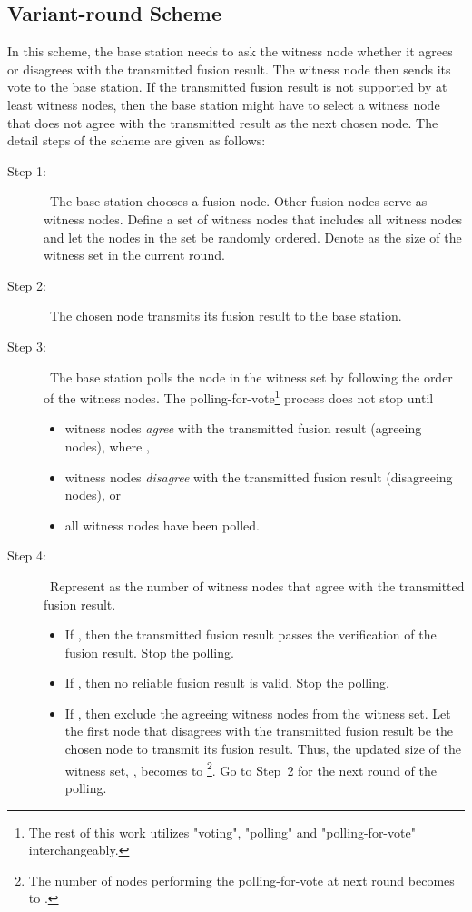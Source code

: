 \documentclass[12pt, onecolumn, draftcls]{IEEEtran}
\begin{document}
\subsection{Variant-round Scheme}
\label{subsec:variant} In this scheme, the base station needs to ask
the witness node whether it agrees or disagrees with the transmitted
fusion result. The witness node then sends its vote to the base
station. If the transmitted fusion result is not supported by at
least  witness nodes, then the base station might have to select
a witness node that does not agree with the transmitted result as
the next chosen node. The detail steps of the scheme are given as
follows:
\begin{description}
\item[Step 1: ]\ The base station chooses a fusion node.
Other fusion nodes serve as witness nodes. Define a set of witness
nodes that includes all witness nodes and let the nodes in the set
be randomly ordered. Denote  as the size of the
witness set in the current round.

\item[Step 2: ]\ The chosen node transmits its fusion result to
the base station.

\item[Step 3: ]\ The base station polls the node in the witness set by
following the order of the witness nodes. The
polling-for-vote\footnote{The rest of this work utilizes "voting",
"polling" and "polling-for-vote" interchangeably.} process does not
stop until
\begin{itemize}
 \item  witness nodes {\it agree} with the transmitted fusion result (agreeing nodes), where ,
 \item  witness nodes {\it disagree} with the transmitted fusion
 result (disagreeing nodes), or
 \item all witness nodes have been polled.
\end{itemize}
\item[Step 4: ]\ Represent  as the number of witness nodes that agree
with the transmitted fusion result.
\begin{itemize}
 \item If , then the transmitted fusion result passes the
 verification of the fusion result. Stop the polling.
\item If , then no reliable fusion result is valid.
 Stop the polling.
 \item If , then exclude the  agreeing witness nodes
from the witness set. Let the first node that disagrees with the
transmitted fusion result be the chosen node to transmit its fusion
result. Thus, the updated size of the witness set, ,
becomes to \footnote{The number of nodes performing
the polling-for-vote at next round becomes to .}. Go
to Step~2 for the next round of the polling.
\end{itemize}
\end{description}
\end{document}
